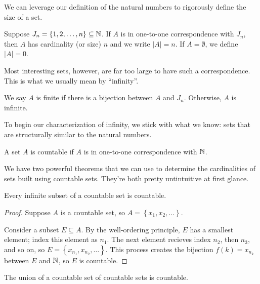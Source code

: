 \documentclass[../m131main.tex]{subfiles}
\begin{document}
We can leverage our definition of the natural numbers to rigorously define the size of a set.

\begin{definition}[Cardinality]
    Suppose $J_n = \left\{ 1, 2, \ldots, n \right\} \subseteq \mathbb{N}$.
    If $A$ is in one-to-one correspondence with $J_n$, then $A$ has cardinality (or size) $n$ and we write $|A| = n$.
    If $A = \emptyset$, we define $|A| = 0$.
\end{definition}

Most interesting sets, however, are far too large to have such a correspondence.
This is what we usually mean by ``infinity''.

\begin{definition}
    We say $A$ is finite if there is a bijection between $A$ and $J_n$.
    Otherwise, $A$ is infinite.
\end{definition}

To begin our characterization of infinity, we stick with what we know: sets that are structurally similar to the natural numbers.

\begin{definition}[Countable]
    A set $A$ is countable if $A$ is in one-to-one correspondence with $\mathbb{N}$.
\end{definition}

We have two powerful theorems that we can use to determine the cardinalities of sets built using countable sets.
They're both pretty untintuitive at first glance.

\begin{theorem}[]
    Every infinite subset of a countable set is countable.
\end{theorem}

\begin{proof}
    Suppose $A$ is a countable set, so $A = \left\{ x_1, x_2, \ldots \right\}$.

    Consider a subset $E \subseteq A$.
    By the well-ordering principle, $E$ has a smallest element; index this element as $n_1$.
    The next element recieves index $n_2$, then $n_3$, and so on, so $E = \left\{ x_{n_1}, x_{n_2}, \ldots \right\}$.
    This process creates the bijection $f(k) = x_{n_k}$ between $E$ and $\mathbb{N}$, so $E$ is countable.
\end{proof}

\begin{theorem}
    The union of a countable set of countable sets is countable.
\end{theorem}
\end{document}
